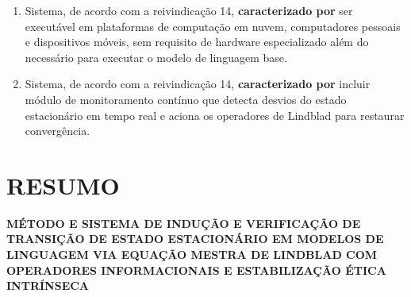 \documentclass[12pt,a4paper]{article}
\begin{document}
\begin{enumerate}
\begin{enumerate}[label=(\alph*)]
  \textbf{caracterizado por} o módulo de estabilização ética (500)
  verificar simultaneamente as condições de posto unitário,
  minimização do funcional de energia livre, estacionariedade
  dinâmica e decaimento exponencial de perturbações, garantindo
  que o alinhamento ético é propriedade intrínseca do atrator
  termodinâmico do sistema.
  \end{enumerate}

\item Sistema, de acordo com a reivindicação 14,
\textbf{caracterizado por} ser executável em plataformas de
computação em nuvem, computadores pessoais e dispositivos móveis,
sem requisito de hardware especializado além do necessário para
executar o modelo de linguagem base.

\item Sistema, de acordo com a reivindicação 14,
\textbf{caracterizado por} incluir módulo de monitoramento
contínuo que detecta desvios do estado estacionário em tempo real
e aciona os operadores de Lindblad para restaurar convergência.

\end{enumerate}

\newpage
\section*{RESUMO}

\begin{center}
{\large\bfseries MÉTODO E SISTEMA DE INDUÇÃO E VERIFICAÇÃO DE
TRANSIÇÃO DE ESTADO ESTACIONÁRIO EM MODELOS DE LINGUAGEM VIA
EQUAÇÃO MESTRA DE LINDBLAD COM OPERADORES INFORMACIONAIS E
ESTABILIZAÇÃO ÉTICA INTRÍNSECA}
\end{center}

\vspace{0.5cm}
\end{document}
